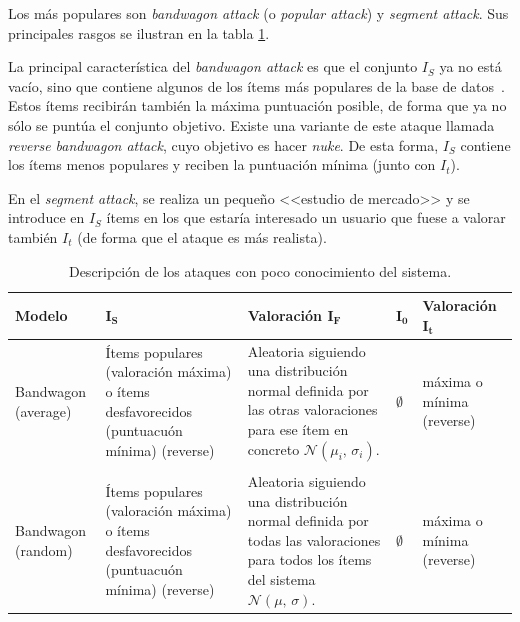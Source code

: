 Los más populares son \textit{bandwagon attack} (o \textit{popular attack}) y \textit{segment attack}. Sus principales rasgos se ilustran en la tabla \ref{tabla_descripcion_ataques_poco_con}.

La principal característica del \textit{bandwagon attack} es que el conjunto $I_S$ ya no está vacío, sino que contiene algunos de los ítems más populares de la base de datos~\cite{zhou2021SemisupervisedRecommendationAttack}. Estos ítems recibirán también la máxima puntuación posible, de forma que ya no sólo se puntúa el conjunto objetivo. Existe una variante de este ataque llamada \textit{reverse bandwagon attack}, cuyo objetivo es hacer \textit{nuke}. De esta forma, $I_S$ contiene los ítems menos populares y reciben la puntuación mínima (junto con $I_t$).

En el \textit{segment attack}, se realiza un pequeño <<estudio de mercado>> y se introduce en $I_S$ ítems en los que estaría interesado un usuario que fuese a valorar también $I_t$ (de forma que el ataque es más realista).

\begin{table}
\small
\begin{centering}
	
		\begin{tabular}{@{}l l l l l@{}}
			\toprule
			\textbf{Modelo} & $\mathbf{I_S}$ & \textbf{Valoración} $\mathbf{I_F}$ & $\mathbf{I_0}$ & \textbf{Valoración} $\mathbf{I_t}$\\ 
			\midrule
			
			\parbox{5em}{Bandwagon (average)} & \parbox{10em} {Ítems populares (valoración máxima) o ítems desfavorecidos (puntuacuón mínima) (reverse)} & \parbox{10em}{Aleatoria siguiendo una distribución normal definida por las otras valoraciones para ese ítem en concreto $\mathcal{N}(\mu_i,\,\sigma_i)$.} & $\emptyset$ & \parbox{5em}{máxima o mínima (reverse)} \\\\
			
			\parbox{5em}{Bandwagon (random)} & \parbox{10em}{Ítems populares (valoración máxima) o ítems desfavorecidos (puntuacuón mínima) (reverse)} & \parbox{10em}{Aleatoria siguiendo una distribución normal definida por todas las valoraciones para todos los ítems del sistema $\mathcal{N}(\mu,\,\sigma)$.} & $\emptyset$ & \parbox{5em}{máxima o mínima (reverse)} \\
			\bottomrule
		\end{tabular}

\end{centering}
\caption{Descripción de los ataques con poco conocimiento del sistema.}
\label{tabla_descripcion_ataques_poco_con}
\end{table}


